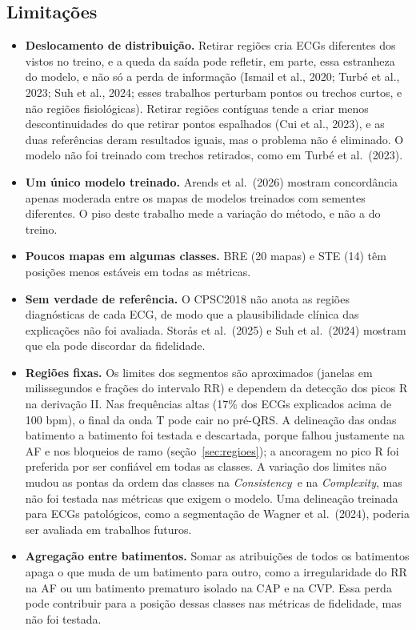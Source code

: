 \documentclass[11pt,a4paper]{article}
\newcommand{\CX}{\textit{Complexity}}
\newcommand{\CS}{\textit{Consistency}}
\begin{document}
\subsection{Limitações}\label{sec:limitacoes}
\begin{itemize}
\item \textbf{Deslocamento de distribuição.} Retirar regiões cria ECGs diferentes dos vistos no treino, e a queda da saída pode refletir, em parte, essa estranheza do modelo, e não só a perda de informação (Ismail et al., 2020; Turbé et al., 2023; Suh et al., 2024; esses trabalhos perturbam pontos ou trechos curtos, e não regiões fisiológicas). Retirar regiões contíguas tende a criar menos descontinuidades do que retirar pontos espalhados (Cui et al., 2023), e as duas referências deram resultados iguais, mas o problema não é eliminado. O modelo não foi treinado com trechos retirados, como em Turbé et al.\ (2023).
\item \textbf{Um único modelo treinado.} Arends et al.\ (2026) mostram concordância apenas moderada entre os mapas de modelos treinados com sementes diferentes. O piso deste trabalho mede a variação do método, e não a do treino.
\item \textbf{Poucos mapas em algumas classes.} BRE (20 mapas) e STE (14) têm posições menos estáveis em todas as métricas.
\item \textbf{Sem verdade de referência.} O CPSC2018 não anota as regiões diagnósticas de cada ECG, de modo que a plausibilidade clínica das explicações não foi avaliada. Storås et al.\ (2025) e Suh et al.\ (2024) mostram que ela pode discordar da fidelidade.
\item \textbf{Regiões fixas.} Os limites dos segmentos são aproximados (janelas em milissegundos e frações do intervalo RR) e dependem da detecção dos picos R na derivação II. Nas frequências altas (17\% dos ECGs explicados acima de 100 bpm), o final da onda T pode cair no pré-QRS. A delineação das ondas batimento a batimento foi testada e descartada, porque falhou justamente na AF e nos bloqueios de ramo (seção~\ref{sec:regioes}); a ancoragem no pico R foi preferida por ser confiável em todas as classes. A variação dos limites não mudou as pontas da ordem das classes na \CS\ e na \CX, mas não foi testada nas métricas que exigem o modelo. Uma delineação treinada para ECGs patológicos, como a segmentação de Wagner et al.\ (2024), poderia ser avaliada em trabalhos futuros.
\item \textbf{Agregação entre batimentos.} Somar as atribuições de todos os batimentos apaga o que muda de um batimento para outro, como a irregularidade do RR na AF ou um batimento prematuro isolado na CAP e na CVP. Essa perda pode contribuir para a posição dessas classes nas métricas de fidelidade, mas não foi testada.
\end{itemize}
\end{document}
